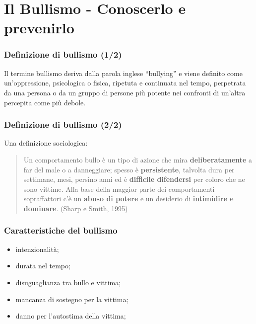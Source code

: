 \documentclass[13pt]{beamer}
\begin{document}
	\section[Bullismo]{Il Bullismo - Conoscerlo e prevenirlo}

	\begin{frame}
		\frametitle{Definizione di bullismo (1/2)}
		Il termine bullismo deriva dalla parola inglese ``bullying'' e viene definito come un'oppressione, psicologica o fisica, ripetuta e continuata nel tempo, perpetrata da una persona  o da un gruppo di persone più potente nei confronti di un'altra percepita come più debole.
	\end{frame}
	\begin{frame}
		\frametitle{Definizione di bullismo (2/2)}
		Una definizione sociologica:
		
		\begin{quote}
			Un comportamento bullo è un tipo di azione che mira \textbf{deliberatamente} a far del male o a danneggiare; spesso è \textbf{persistente}, talvolta dura per settimane, mesi, persino anni ed è \textbf{difficile difendersi} per coloro che ne sono vittime. Alla base della maggior parte dei comportamenti sopraffattori c'è un \textbf{abuso di potere} e un desiderio di \textbf{intimidire e dominare}.
			\hfill (Sharp e Smith, 1995)
		\end{quote}		
	\end{frame}

	\begin{frame}
		\frametitle{Caratteristiche del bullismo}
		
		\begin{itemize}
			\item intenzionalità;
			\item durata nel tempo;
			\item disuguaglianza tra bullo e vittima;
			\item mancanza di sostegno per la vittima;
			\item danno per l'autostima della vittima;
			
		\end{itemize}
		
	\end{frame}
\end{document}
